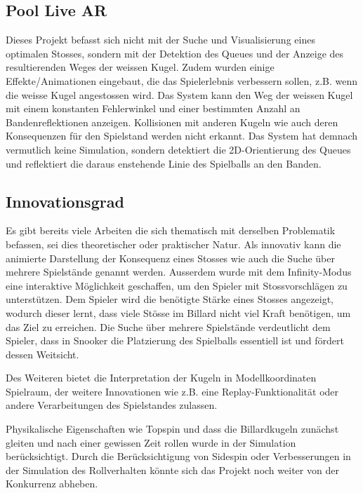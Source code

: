 \subsection{Pool Live AR}
Dieses Projekt befasst sich nicht mit der Suche und Visualisierung eines optimalen Stosses, sondern mit der
Detektion des Queues und der Anzeige des resultierenden Weges der weissen Kugel\cite{poollivear}. Zudem wurden einige
Effekte/Animationen eingebaut, die das Spielerlebnis verbessern sollen, z.B. wenn die weisse Kugel angestossen wird.
Das System kann den Weg der weissen Kugel mit einem konstanten Fehlerwinkel und einer bestimmten Anzahl an
Bandenreflektionen anzeigen.
Kollisionen mit anderen Kugeln wie auch deren Konsequenzen für den Spielstand werden nicht erkannt.
Das System hat demnach vermutlich keine Simulation, sondern detektiert die 2D-Orientierung des Queues und reflektiert die
daraus enstehende Linie des Spielballs an den Banden.

\subsection{Innovationsgrad}
Es gibt bereits viele Arbeiten die sich thematisch mit derselben Problematik befassen, sei dies theoretischer oder
praktischer Natur.
Als innovativ kann die animierte Darstellung der Konsequenz eines Stosses wie auch die Suche über
mehrere Spielstände genannt werden.
Ausserdem wurde mit dem Infinity-Modus eine interaktive Möglichkeit geschaffen, um den Spieler mit Stossvorschlägen zu unterstützen.
Dem Spieler wird die benötigte Stärke eines Stosses angezeigt, wodurch dieser lernt, dass viele Stösse im Billard nicht viel
Kraft benötigen, um das Ziel zu erreichen.
Die Suche über mehrere Spielstände verdeutlicht dem Spieler, dass in Snooker die Platzierung des Spielballs essentiell ist
und fördert dessen Weitsicht.

Des Weiteren bietet die Interpretation der Kugeln in Modellkoordinaten Spielraum,
der weitere Innovationen wie z.B. eine Replay-Funktionalität oder andere Verarbeitungen des Spielstandes zulassen.

Physikalische Eigenschaften wie Topspin und dass die Billardkugeln zunächst gleiten und nach einer gewissen Zeit rollen
wurde in der Simulation berücksichtigt.
Durch die Berücksichtigung von Sidespin oder Verbesserungen in der Simulation des Rollverhalten könnte sich das
Projekt noch weiter von der Konkurrenz abheben.
